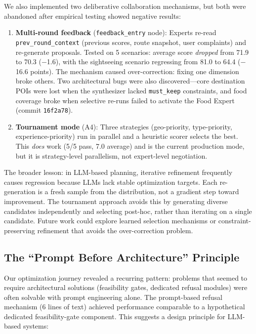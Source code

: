 We also implemented two deliberative collaboration mechanisms, but both were abandoned after empirical testing showed negative results:

\begin{enumerate}[leftmargin=*]
    \item \textbf{Multi-round feedback} (\texttt{feedback\_entry} node): Experts re-read \texttt{prev\_round\_context} (previous scores, route snapshot, user complaints) and re-generate proposals. Tested on 5 scenarios: average score \textit{dropped} from 71.9 to 70.3 ($-$1.6), with the sightseeing scenario regressing from 81.0 to 64.4 ($-$16.6 points). The mechanism caused over-correction: fixing one dimension broke others. Two architectural bugs were also discovered---core destination POIs were lost when the synthesizer lacked \texttt{must\_keep} constraints, and food coverage broke when selective re-runs failed to activate the Food Expert (commit \texttt{16f2a78}).

    \item \textbf{Tournament mode} (A4): Three strategies (geo-priority, type-priority, experience-priority) run in parallel and a heuristic scorer selects the best. This \textit{does} work (5/5 pass, 7.0 average) and is the current production mode, but it is strategy-level parallelism, not expert-level negotiation.
\end{enumerate}

The broader lesson: in LLM-based planning, iterative refinement frequently causes regression because LLMs lack stable optimization targets. Each re-generation is a fresh sample from the distribution, not a gradient step toward improvement. The tournament approach avoids this by generating diverse candidates independently and selecting post-hoc, rather than iterating on a single candidate. Future work could explore learned selection mechanisms or constraint-preserving refinement that avoids the over-correction problem.

\subsection{The ``Prompt Before Architecture'' Principle}

Our optimization journey revealed a recurring pattern: problems that seemed to require architectural solutions (feasibility gates, dedicated refusal modules) were often solvable with prompt engineering alone. The prompt-based refusal mechanism (6 lines of text) achieved performance comparable to a hypothetical dedicated feasibility-gate component. This suggests a design principle for LLM-based systems:

